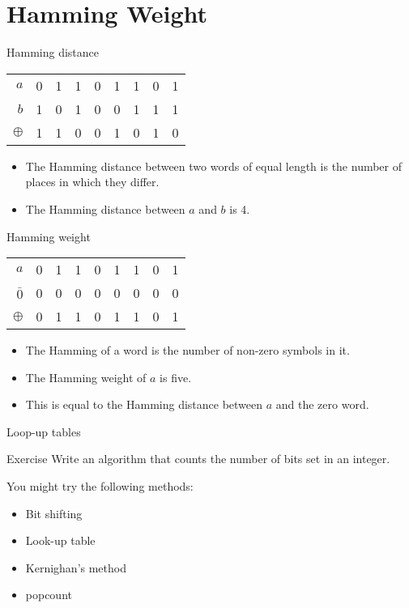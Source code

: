 \documentclass{beamer}
\begin{document}
\section{Hamming Weight}

\begin{frame}{Hamming distance}
  \begin{table}
    \centering
    \begin{tabular}{rcccccccc}
      \toprule
      $a$      & 0 & 1 & 1 & 0 & 1 & 1 & 0 & 1 \\
      $b$      & 1 & 0 & 1 & 0 & 0 & 1 & 1 & 1 \\
      \midrule
      $\oplus$ & 1 & 1 & 0 & 0 & 1 & 0 & 1 & 0 \\
      \bottomrule
    \end{tabular}
  \end{table}
  \begin{itemize}
    \item The Hamming distance between two words of equal length is the number of places in which they differ.
    \item The Hamming distance between $a$ and $b$ is 4.
  \end{itemize}
\end{frame}

\begin{frame}{Hamming weight}
  \begin{table}
    \centering
    \begin{tabular}{rcccccccc}
      \toprule
      $a$      & 0 & 1 & 1 & 0 & 1 & 1 & 0 & 1 \\
      $\bar{0}$      & 0 & 0 & 0 & 0 & 0 & 0 & 0 & 0 \\
      \midrule
      $\oplus$ & 0 & 1 & 1 & 0 & 1 & 1 & 0 & 1 \\
      \bottomrule
    \end{tabular}
  \end{table}
  \begin{itemize}
    \item The Hamming of a word is the number of non-zero symbols in it.
    \item The Hamming weight of $a$ is five.
    \item This is equal to the Hamming distance between $a$ and the zero word.
  \end{itemize}
\end{frame}


\begin{frame}{Loop-up tables}
  \begin{exampleblock}{Exercise}
    Write an algorithm that counts the number of bits set in an integer.
  \end{exampleblock}
  
  \pause
  
  You might try the following methods:
  \begin{itemize}
    \item Bit shifting
    \item Look-up table
    \item Kernighan's method
    \item popcount
  \end{itemize}
\end{frame}
\end{document}
